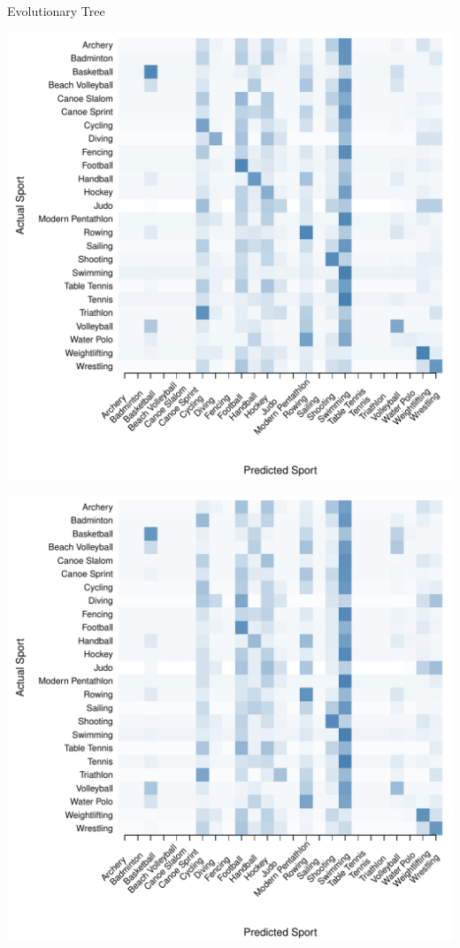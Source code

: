 \documentclass[landscape, paperwidth=42in, paperheight=36in,
fontscale=.35, margin=1in]{baposter}
\begin{document}
\begin{poster}
{\begin{center}
    Evolutionary Tree \\

  \begin{minipage}{0.45\textwidth}
    \begin{center}
      \includegraphics[scale=0.27]{../graphics/sportEV-trn.pdf}
    \end{center}
  \end{minipage}
  \hspace{0.05\textwidth}
  \begin{minipage}{0.45\textwidth}
    \begin{center}
      \includegraphics[scale=0.27]{../graphics/sportEV-tst.pdf}

\end{center}
\end{minipage}
\end{center}}
\end{poster}
\end{document}

